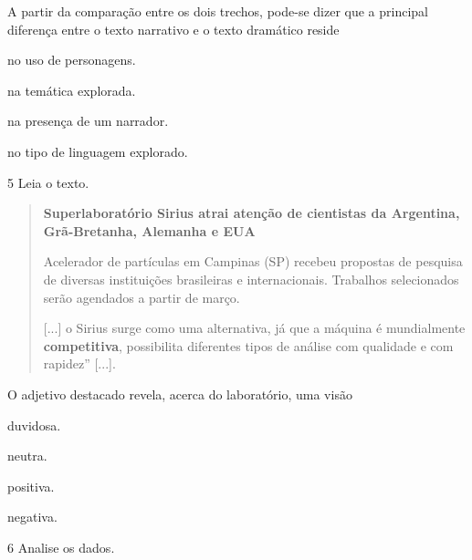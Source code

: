 \pagebreak
A partir da comparação entre os dois trechos, pode-se dizer que a
principal diferença entre o texto narrativo e o texto dramático reside

\begin{escolha}
\item no uso de personagens.

\item na temática explorada.

\item na presença de um narrador.

\item no tipo de linguagem explorado.
\end{escolha}


\num{5} Leia o texto.

\begin{quote}
\textbf{Superlaboratório Sirius atrai atenção de cientistas da
Argentina, Grã-Bretanha, Alemanha e EUA}

Acelerador de partículas em Campinas (SP) recebeu propostas de
pesquisa de diversas instituições brasileiras e internacionais.
Trabalhos selecionados serão agendados a partir de março.

{[}...{]} o Sirius surge como uma alternativa, já que a máquina é
mundialmente \textbf{competitiva}, possibilita diferentes tipos de
análise com qualidade e com rapidez” {[}...{]}.

\end{quote}

O adjetivo destacado revela, acerca do laboratório, uma visão

\begin{escolha}
\item duvidosa.

\item neutra.

\item positiva.

\item negativa.
\end{escolha}


\pagebreak
\num{6} Analise os dados.

